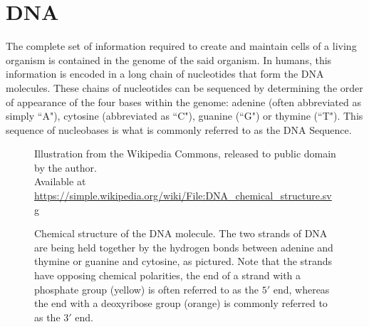 \documentclass[parskip]{cs4rep}
\begin{document}
\section{DNA}

The complete set of information required to create and maintain cells of a
living organism is contained in the genome of the said organism. In humans, this
information is encoded in a long chain of nucleotides that form the DNA molecules. 
These chains of nucleotides can be sequenced by determining the order of appearance
of the four bases within the genome: adenine (often abbreviated as simply ``A"), cytosine (abbreviated as ``C"),
guanine (``G") or thymine (``T").
This sequence of nucleobases is what is commonly referred to as the DNA Sequence. 

\begin{figure}[p]
    \centering
                 {Illustration from the Wikipedia Commons, released to public domain by the author.\\
                  Available at \url{https://simple.wikipedia.org/wiki/File:DNA_chemical_structure.svg}}
    \caption{Chemical structure of the DNA molecule. The two strands of DNA are being held together by the hydrogen bonds between adenine and thymine or guanine and cytosine, as pictured. Note that the strands have opposing chemical polarities, the end of a strand with a phosphate group (yellow) is often referred to as the $5'$ end, whereas the end with a deoxyribose group (orange) is commonly referred to as the $3'$ end.}
    \label{fig:background:dna_structure}
\end{figure}
\end{document}
